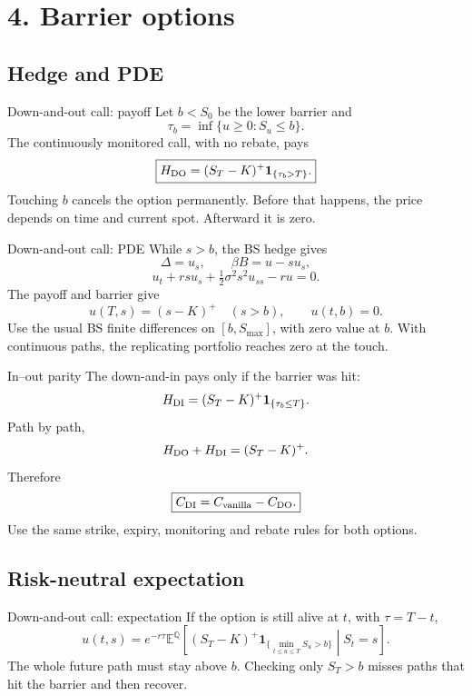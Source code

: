 \documentclass[handout,10pt,t,aspectratio=169]{beamer}
\newcommand{\E}{\mathbb E}
\newcommand{\Q}{\mathbb Q}
\newcommand{\ind}{\mathbf 1}
\begin{document}
\section{4. Barrier options}
\subsection{Hedge and PDE}

\begin{frame}{Down-and-out call: payoff}
\small
Let \(b<S_0\) be the lower barrier and
\[
 \tau_b=\inf\{u\geq0:S_u\leq b\}.
\]
The continuously monitored call, with no rebate, pays
\[
 \boxed{H_{\rm DO}=(S_T-K)^+\ind_{\{\tau_b>T\}}.}
\]
Touching \(b\) cancels the option permanently. Before that happens,
the price depends on time and current spot. Afterward it is zero.
\end{frame}

\begin{frame}{Down-and-out call: PDE}
\small
While \(s>b\), the BS hedge gives
\[
 \Delta=u_s,\qquad\beta B=u-su_s,
\]
\[
 u_t+rsu_s+\tfrac12\sigma^2s^2u_{ss}-ru=0.
\]
The payoff and barrier give
\[
 \boxed{u(T,s)=(s-K)^+\quad(s>b),\qquad u(t,b)=0.}
\]
Use the usual BS finite differences on \([b,S_{\max}]\), with zero value at \(b\).
With continuous paths, the replicating portfolio reaches zero at the touch.
\end{frame}

\begin{frame}{In--out parity}
\small
The down-and-in pays only if the barrier was hit:
\[
 H_{\rm DI}=(S_T-K)^+\ind_{\{\tau_b\leq T\}}.
\]
Path by path,
\[
 H_{\rm DO}+H_{\rm DI}=(S_T-K)^+.
\]
Therefore
\[
 \boxed{C_{\rm DI}=C_{\rm vanilla}-C_{\rm DO}.}
\]
Use the same strike, expiry, monitoring and rebate rules for both options.
\end{frame}

\subsection{Risk-neutral expectation}

\begin{frame}{Down-and-out call: expectation}
\small
If the option is still alive at \(t\), with \(\tau=T-t\),
\[
 u(t,s)=e^{-r\tau}\E^\Q\!\left[
 (S_T-K)^+\ind_{\{\min_{t\leq u\leq T}S_u>b\}}
 \middle|S_t=s\right].
\]
The whole future path must stay above \(b\).
Checking only \(S_T>b\) misses paths that hit the barrier and then recover.
\end{frame}
\end{document}
